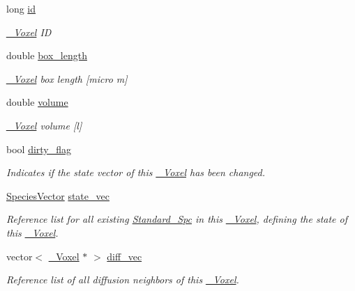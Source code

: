 \begin{DoxyCompactItemize}
\item 
long \hyperlink{classnw_1_1___voxel_a01b73aff9af26230df4c483c5bd81896}{id}
\begin{DoxyCompactList}\small\item\em \hyperlink{classnw_1_1___voxel}{\+\_\+\+Voxel} I\+D \end{DoxyCompactList}\item 
double \hyperlink{classnw_1_1___voxel_ad9c3dbd0ea989af6ba7e1b5e09f6a989}{box\+\_\+length}
\begin{DoxyCompactList}\small\item\em \hyperlink{classnw_1_1___voxel}{\+\_\+\+Voxel} box length \mbox{[}micro m\mbox{]} \end{DoxyCompactList}\item 
double \hyperlink{classnw_1_1___voxel_ab55b70a476c9335f0df9d276105c0335}{volume}
\begin{DoxyCompactList}\small\item\em \hyperlink{classnw_1_1___voxel}{\+\_\+\+Voxel} volume \mbox{[}l\mbox{]} \end{DoxyCompactList}\item 
bool \hyperlink{classnw_1_1___voxel_a9c331fe7c0fd8691ef0124f33809764f}{dirty\+\_\+flag}
\begin{DoxyCompactList}\small\item\em Indicates if the state vector of this \hyperlink{classnw_1_1___voxel}{\+\_\+\+Voxel} has been changed. \end{DoxyCompactList}\item 
\hyperlink{namespacenw_a68aa8285591d78ebfc793c531bd43a23}{Species\+Vector} \hyperlink{classnw_1_1___voxel_a7762f59802c2a0b54bd18acbf803ff34}{state\+\_\+vec}
\begin{DoxyCompactList}\small\item\em Reference list for all existing \hyperlink{classnw_1_1_standard___spc}{Standard\+\_\+\+Spc} in this \hyperlink{classnw_1_1___voxel}{\+\_\+\+Voxel}, defining the state of this \hyperlink{classnw_1_1___voxel}{\+\_\+\+Voxel}. \end{DoxyCompactList}\item 
vector$<$ \hyperlink{classnw_1_1___voxel}{\+\_\+\+Voxel} $\ast$ $>$ \hyperlink{classnw_1_1___voxel_abb780e4dc55e1cde47756aef6e2d746f}{diff\+\_\+vec}
\begin{DoxyCompactList}\small\item\em Reference list of all diffusion neighbors of this \hyperlink{classnw_1_1___voxel}{\+\_\+\+Voxel}. \end{DoxyCompactList}\end{DoxyCompactItemize}


